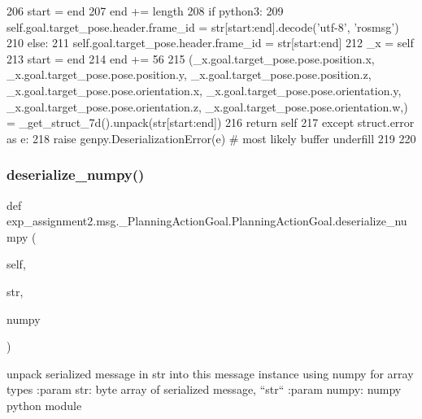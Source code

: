 \begin{DoxyCode}
206       start = end
207       end += length
208       \textcolor{keywordflow}{if} python3:
209         self.goal.target\_pose.header.frame\_id = str[start:end].decode(\textcolor{stringliteral}{'utf-8'}, \textcolor{stringliteral}{'rosmsg'})
210       \textcolor{keywordflow}{else}:
211         self.goal.target\_pose.header.frame\_id = str[start:end]
212       \_x = self
213       start = end
214       end += 56
215       (\_x.goal.target\_pose.pose.position.x, \_x.goal.target\_pose.pose.position.y, 
      \_x.goal.target\_pose.pose.position.z, \_x.goal.target\_pose.pose.orientation.x, \_x.goal.target\_pose.pose.orientation.y, 
      \_x.goal.target\_pose.pose.orientation.z, \_x.goal.target\_pose.pose.orientation.w,) = \_get\_struct\_7d().unpack(str[start:end])
216       \textcolor{keywordflow}{return} self
217     \textcolor{keywordflow}{except} struct.error \textcolor{keyword}{as} e:
218       \textcolor{keywordflow}{raise} genpy.DeserializationError(e)  \textcolor{comment}{# most likely buffer underfill}
219 
220 
\end{DoxyCode}
\mbox{\label{classexp__assignment2_1_1msg_1_1__PlanningActionGoal_1_1PlanningActionGoal_ae4e308a1e5f88e29921d88f235678da1}} 
\subsubsection{\texorpdfstring{deserialize\+\_\+numpy()}{deserialize\_numpy()}}
{\footnotesize\ttfamily def exp\+\_\+assignment2.\+msg.\+\_\+\+Planning\+Action\+Goal.\+Planning\+Action\+Goal.\+deserialize\+\_\+numpy (\begin{DoxyParamCaption}\item[{}]{self,  }\item[{}]{str,  }\item[{}]{numpy }\end{DoxyParamCaption})}

\begin{DoxyVerb}unpack serialized message in str into this message instance using numpy for array types
:param str: byte array of serialized message, ``str``
:param numpy: numpy python module
\end{DoxyVerb}
 

